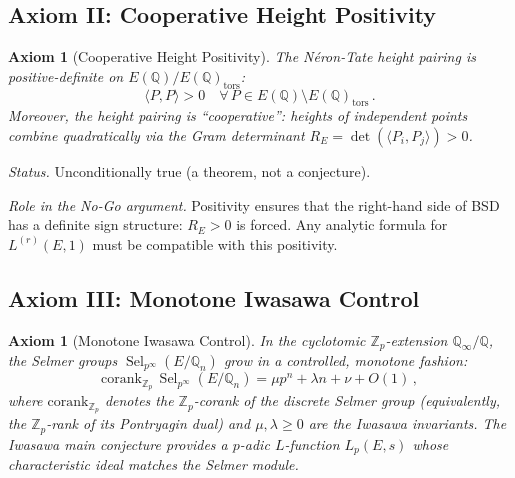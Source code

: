 \documentclass[aps,prd,twocolumn,superscriptaddress,nofootinbib]{revtex4-2}
\newtheorem{axiom}[theorem]{Axiom}
\theoremstyle{definition}
\theoremstyle{remark}
\DeclareMathOperator{\Sel}{Sel}
\begin{document}
\subsection{Axiom II: Cooperative Height Positivity}

\begin{axiom}[Cooperative Height Positivity]
\label{ax:positivity}
The N\'eron-Tate height pairing is positive-definite on $E(\mathbb{Q})/E(\mathbb{Q})_{\mathrm{tors}}$:
\begin{equation}
\langle P, P \rangle > 0 \quad \forall\, P \in E(\mathbb{Q}) \setminus E(\mathbb{Q})_{\mathrm{tors}}\,.
\end{equation}
Moreover, the height pairing is ``cooperative'': heights of independent points combine quadratically via the Gram determinant $R_E = \det(\langle P_i, P_j \rangle) > 0$.
\end{axiom}

\textit{Status.} Unconditionally true (a theorem, not a conjecture).

\textit{Role in the No-Go argument.} Positivity ensures that the right-hand side of BSD has a definite sign structure: $R_E > 0$ is forced. Any analytic formula for $L^{(r)}(E,1)$ must be compatible with this positivity.

\subsection{Axiom III: Monotone Iwasawa Control}

\begin{axiom}[Monotone Iwasawa Control]
\label{ax:iwasawa}
In the cyclotomic $\mathbb{Z}_p$-extension $\mathbb{Q}_\infty/\mathbb{Q}$, the Selmer groups $\Sel_{p^\infty}(E/\mathbb{Q}_n)$ grow in a controlled, monotone fashion:
\begin{equation}
\mathrm{corank}_{\mathbb{Z}_p}\, \Sel_{p^\infty}(E/\mathbb{Q}_n) = \mu p^n + \lambda n + \nu + O(1)\,,
\label{eq:iwasawa_growth}
\end{equation}
where $\mathrm{corank}_{\mathbb{Z}_p}$ denotes the $\mathbb{Z}_p$-corank of the discrete Selmer group (equivalently, the $\mathbb{Z}_p$-rank of its Pontryagin dual) and $\mu, \lambda \geq 0$ are the Iwasawa invariants. The Iwasawa main conjecture provides a $p$-adic $L$-function $L_p(E,s)$ whose characteristic ideal matches the Selmer module.
\end{axiom}
\end{document}
